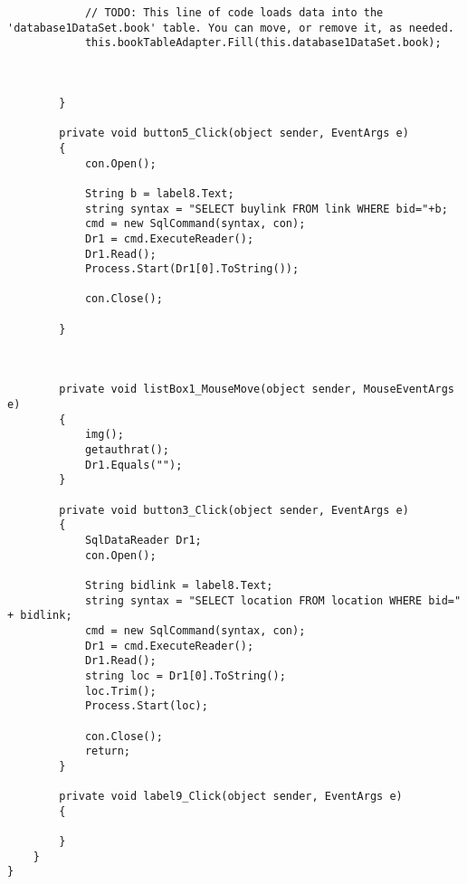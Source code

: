 \begin{lstlisting}
            // TODO: This line of code loads data into the 'database1DataSet.book' table. You can move, or remove it, as needed.
            this.bookTableAdapter.Fill(this.database1DataSet.book);
           
           

        }

        private void button5_Click(object sender, EventArgs e)
        {
            con.Open();

            String b = label8.Text;
            string syntax = "SELECT buylink FROM link WHERE bid="+b;
            cmd = new SqlCommand(syntax, con);
            Dr1 = cmd.ExecuteReader();
            Dr1.Read();
            Process.Start(Dr1[0].ToString());
            
            con.Close();

        }

        

        private void listBox1_MouseMove(object sender, MouseEventArgs e)
        {
            img();
            getauthrat();
            Dr1.Equals("");
        }

        private void button3_Click(object sender, EventArgs e)
        {
            SqlDataReader Dr1;
            con.Open();

            String bidlink = label8.Text;
            string syntax = "SELECT location FROM location WHERE bid=" + bidlink;
            cmd = new SqlCommand(syntax, con);
            Dr1 = cmd.ExecuteReader();
            Dr1.Read();
            string loc = Dr1[0].ToString();
            loc.Trim();
            Process.Start(loc);
           
            con.Close();
            return;
        }

        private void label9_Click(object sender, EventArgs e)
        {

        }
    }
}
\end{lstlisting}
